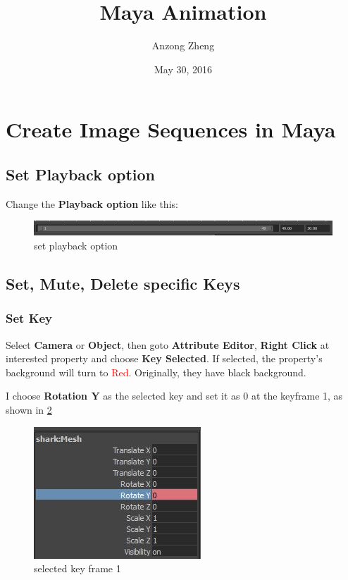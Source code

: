 \documentclass[10pt,a4paper]{article}
\begin{document}
\author{Anzong Zheng}
\title{Maya Animation}
\date{May 30, 2016}
\maketitle

\tableofcontents

\newpage

\section{Create Image Sequences in Maya}
\subsection{Set Playback option}
Change the \textbf{Playback option} like this:

\begin{figure}[h]
\centering
\includegraphics[width=0.7\linewidth]{playbackOption}
\caption{set playback option}
\label{fig:playbackOption}
\end{figure}

\subsection{Set, Mute, Delete specific Keys}
\subsubsection{Set Key}
Select \textbf{Camera} or \textbf{Object}, then goto \textbf{Attribute Editor}, \textbf{Right Click} at interested property and choose \textbf{Key Selected}. If selected, the property's background will turn to \textcolor{red}{Red}. Originally, they have \textcolor{black}{black} background.

I choose \textbf{Rotation Y} as the selected key and set it as 0 at the keyframe 1, as shown in \ref{fig:selectedKey_frame1}

\begin{figure}[h]
\centering
\includegraphics[scale=0.5]{selectedKey_frame1}
\caption{selected key frame 1}
\label{fig:selectedKey_frame1}
\end{figure}
\end{document}
